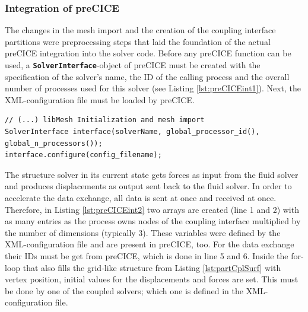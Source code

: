   \subsubsection{Integration of preCICE}\label{sec:Coupl-Impl-Integration}
   The changes in the mesh import and the creation of the coupling interface partitions were preprocessing steps that laid the foundation of the actual preCICE integration into the solver code. Before any preCICE function can be used, a \texttt{\textbf{SolverInterface}}-object of preCICE must be created with the specification of the solver's name, the ID of the calling process and the overall number of processes used for this solver (see Listing \ref{lst:preCICEint1}). Next, the XML-configuration file must be loaded by preCICE.
\begin{lstlisting}[caption=preCICE Integration Part 1,label=lst:preCICEint1,keepspaces=true]
// (...) libMesh Initialization and mesh import
SolverInterface interface(solverName, global_processor_id(), global_n_processors());
interface.configure(config_filename);
\end{lstlisting}
   The structure solver in its current state gets forces as input from the fluid solver and produces displacements as output sent back to the fluid solver. In order to accelerate the data exchange, all data is sent at once and received at once. Therefore, in Listing \ref{lst:preCICEint2} two arrays are created (line 1 and 2) with as many entries as the process owns nodes of the coupling interface multiplied by the number of dimensions (typically 3). These variables were defined by the XML-configuration file and are present in preCICE, too. For the data exchange their IDs must be get from preCICE, which is done in line 5 and 6. Inside the for-loop that also fills the grid-like structure from Listing \ref{lst:partCplSurf} with vertex position, initial values for the displacements and forces are set. This must be done by one of the coupled solvers; which one is defined in the XML-configuration file.

